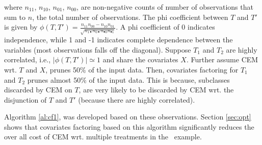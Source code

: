 \noindent  where $n_{11}$, $n_{10}$, $n_{01}$, $n_{00}$, are non-negative counts of number of observations that sum to $n$, the total number of observations.
 The phi coefficient between $T$ and $T'$ is given by
  $\phi(T,T') ={\frac  {n_{{11}}n_{{00}}-n_{{10}}n_{{01}}}{{\sqrt  {n_{{1\bullet }}n_{{0\bullet }}n_{{\bullet 0}}n_{{\bullet 1}}}}}}$. A phi coefficient of 0  indicates independence, while 1 and -1 indicates complete dependence between the variables (most observations falls off the diagonal).   Suppose $T_1$ and $T_2$ are highly correlated, i.e.,  $|\phi(T,T')|\simeq 1$ and share the covariates $X$. Further assume CEM wrt. $T$ and $X$, prunes 50\% of the input data.
Then, covariates factoring for $T_1$ and $T_2$ prunes almost 50\% of the input data. This is because, subclasses discarded by
CEM on $T$, are very likely to be discarded by CEM wrt. the disjunction of $T$ and $T'$ (because there are highly correlated). 

Algorithm \ref{al:cf1}, was developed based on these observations.  Section \ref{sec:opt} shows that covariates factoring based on this algorithm significantly reduces the over all cost of CEM wrt. multiple treatments in the \delay\ example.

